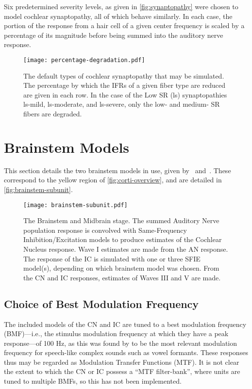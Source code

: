 Six predetermined severity levels, as given in \autoref{fig:synaptopathy} were chosen to model cochlear synaptopathy, all of which behave similarly.  In each case, the portion of the response from a hair cell of a given center frequency is scaled by a percentage of its magnitude before being summed into the auditory nerve response.  

\begin{figure}[htbp]
	\centering
	\texttt{[image: percentage-degradation.pdf]}
	\caption[Cochlear Synaptopathy Parameters]{The default types of cochlear synaptopathy that may be simulated. The percentage by which the IFRs of a given fiber type are reduced are given in each row.  In the case of the Low SR (ls) synaptopathies ls-mild, ls-moderate, and ls-severe, only the low- and medium- SR fibers are degraded.}
	\label{fig:synaptopathy}
\end{figure}

\section{Brainstem Models} %
\label{sec:brainstem_models}
This section details the two brainstem models in use, given by~\cite{Nelson2004Phenomenological} and~\cite{Carney2015Speech}.  These correspond to the yellow region of \autoref{fig:corti-overview}, and are detailed in \autoref{fig:brainstem-subunit}.

\begin{figure}[htbp]
	\centering
	\texttt{[image: brainstem-subunit.pdf]}
	\caption[The Brainstem and Midbrain Stage]{The Brainstem and Midbrain stage.  The summed Auditory Nerve population response is convolved with Same-Frequency Inhibition/Excitation models to produce estimates of the Cochlear Nucleus response.  Wave I estimates are made from the AN response.  The response of the IC is simulated with one or three SFIE model(s), depending on which brainstem model was chosen.  From the CN and IC responses, estimates of Waves III and V are made.}
	\label{fig:brainstem-subunit}
\end{figure}

\subsection{Choice of Best Modulation Frequency}
The included models of the CN and IC are tuned to a best modulation frequency (BMF)---i.e., the stimulus modulation frequency at which they have a peak response---of 100 Hz, as this was found by \cite{Carney2015Speech} to be the most relevant modulation frequency for speech-like complex sounds such as vowel formants. These responses thus may be regarded as Modulation Transfer Functions (MTF).  It is not clear the extent to which the CN or IC possess a ``MTF filter-bank'', where units are tuned to multiple BMFs, so this has not been implemented.

